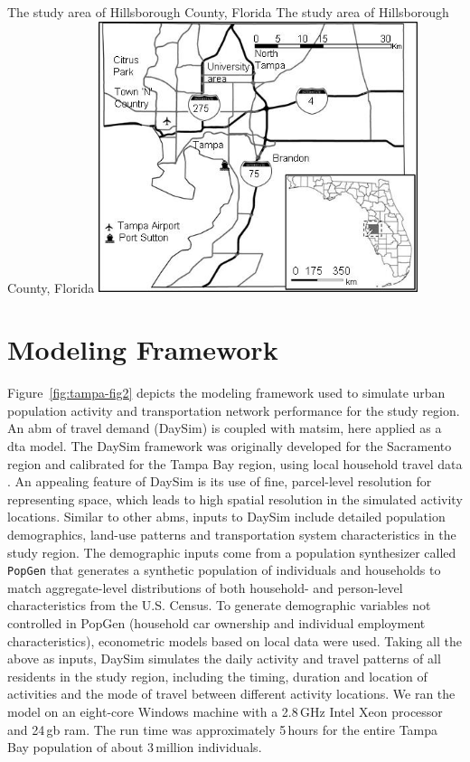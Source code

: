 \createfigure%
{The study area of Hillsborough County, Florida}%
{The study area of Hillsborough County, Florida}%
{\label{fig:tampa-fig1}}%
{\includegraphics[width=0.7\textwidth, angle=0]{./scenarios/figures/tampa-fig1.jpg}}%
{\citet[][]{GurramEtAl_AQAH_2015}}

\section{Modeling Framework}
Figure~\ref{fig:tampa-fig2} depicts the modeling framework used to simulate urban population activity and transportation network performance for the study region. 
An \gls{abm} of travel demand (DaySim) is coupled with \gls{matsim}, here applied as a \gls{dta} model. 
The DaySim framework was originally developed for the Sacramento region \citep[][]{BradleyEtAl_JOCM_2010} and calibrated for the Tampa Bay region, using local household travel data \citep[][]{GliebeEtAl_TRB_2014}. 
An appealing feature of DaySim is its use of fine, parcel-level resolution for representing space, which leads to high spatial resolution in the simulated activity locations.  
Similar to other \glspl{abm}, inputs to DaySim include detailed population demographics, land-use patterns and transportation system characteristics in the study region. The demographic inputs come from a population synthesizer called \lstinline|PopGen| \citep[][]{PendyalaEtAl_2011} that generates a synthetic population of individuals and households to match aggregate-level distributions of both household- and person-level characteristics from the U.S. Census. 
To generate demographic variables not controlled in PopGen (\eg household car ownership and individual employment characteristics), econometric models based on local data were used. 
Taking all the above as inputs, DaySim simulates the daily activity and travel patterns of all residents in the study region, including the timing, duration and location of activities and the mode of travel between different activity locations. 
We ran the model on an eight-core Windows machine with a 2.8\,GHz Intel Xeon processor and 24\,\gls{gb} \gls{ram}. 
The run time was approximately 5\,hours for the entire Tampa Bay population of about 3\,million individuals.

